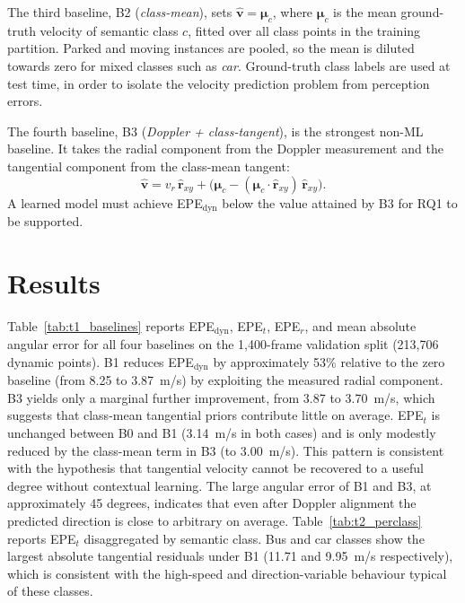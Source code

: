 \documentclass[a4paper,12pt]{article}
\begin{document}
The third baseline, B2 (\emph{class-mean}), sets $\hat{\mathbf{v}} = \boldsymbol{\mu}_c$, where $\boldsymbol{\mu}_c$ is the mean ground-truth velocity of semantic class $c$, fitted over all class points in the training partition. Parked and moving instances are pooled, so the mean is diluted towards zero for mixed classes such as \textit{car}. Ground-truth class labels are used at test time, in order to isolate the velocity prediction problem from perception errors.

The fourth baseline, B3 (\emph{Doppler + class-tangent}), is the strongest non-ML baseline. It takes the radial component from the Doppler measurement and the tangential component from the class-mean tangent:
\begin{equation}
    \hat{\mathbf{v}} = v_r\,\hat{\mathbf{r}}_{xy} + \bigl(\boldsymbol{\mu}_c - (\boldsymbol{\mu}_c \cdot \hat{\mathbf{r}}_{xy})\,\hat{\mathbf{r}}_{xy}\bigr).
    \label{eq:b3}
\end{equation}
A learned model must achieve EPE$_\mathrm{dyn}$ below the value attained by B3 for RQ1 to be supported.


\newpage

\section{Results}
\label{Results}

Table~\ref{tab:t1_baselines} reports EPE$_\mathrm{dyn}$, EPE$_t$, EPE$_r$, and mean absolute angular error for all four baselines on the 1{,}400-frame validation split (213{,}706 dynamic points). B1 reduces EPE$_\mathrm{dyn}$ by approximately 53\% relative to the zero baseline (from 8.25 to 3.87~m/s) by exploiting the measured radial component. B3 yields only a marginal further improvement, from 3.87 to 3.70~m/s, which suggests that class-mean tangential priors contribute little on average. EPE$_t$ is unchanged between B0 and B1 (3.14~m/s in both cases) and is only modestly reduced by the class-mean term in B3 (to 3.00~m/s). This pattern is consistent with the hypothesis that tangential velocity cannot be recovered to a useful degree without contextual learning. The large angular error of B1 and B3, at approximately 45 degrees, indicates that even after Doppler alignment the predicted direction is close to arbitrary on average. Table~\ref{tab:t2_perclass} reports EPE$_t$ disaggregated by semantic class. Bus and car classes show the largest absolute tangential residuals under B1 (11.71 and 9.95~m/s respectively), which is consistent with the high-speed and direction-variable behaviour typical of these classes.
\end{document}
